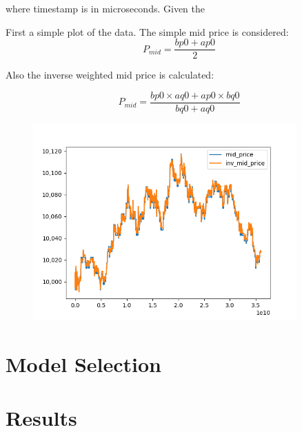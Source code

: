 \documentclass[english, 11pt, a4paper]{article}
\begin{document}
where timestamp is in microseconds. Given the 


First a simple plot of the data. The simple mid price is considered:
\begin{equation}
    P_{mid} = \frac{bp0 + ap0}{2}
\end{equation}

Also the inverse weighted mid price is calculated:

\begin{equation}
    P_{mid} = \frac{bp0\times aq0 + ap0 \times bq0}{bq0 + aq0}
\end{equation}

 \begin{figure}[H] 
	\centering
	\includegraphics[width=0.90\textwidth]{../data/figures/plot_mid_price_inv_mid_price.png}
	\caption{}
	\label{fig1}
\end{figure}



\section{Model Selection}

\section{Results}



%
\end{document}
